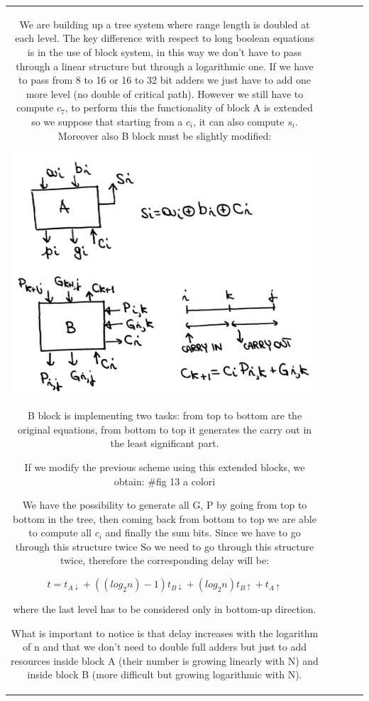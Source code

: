 \begin{center}
\begin{tabular}{|c|c|c|c|c|}
We are building up a tree system where range length is doubled at each level. The key difference with respect to long boolean equations is in the use of block system, in this way we don't have to pass through a linear structure but through a logarithmic one. If we have to pass from 8 to 16 or 16 to 32 bit adders we just have to add one more level (no double of critical path). However we still have to compute $c_7$, to perform this the functionality of block A is extended so we suppose that starting from a $c_i$, it can also compute $s_i$. Moreover also B block must be slightly modified:
\begin{center}
  \includegraphics[width=0.6\linewidth]{img/img2/14}
\end{center}

B block is implementing two tasks: from top to bottom are the original equations, from bottom to top it generates the carry out in the least significant part.

If we modify the previous scheme using this extended blocks, we obtain:
\#fig 13 a colori

We have the possibility to generate all G, P by going from top to bottom in the tree, then coming back from bottom to top we are able to compute all $c_i$ and finally the sum bits. Since we have to go through this structure twice So we need to go through this structure twice, therefore the corresponding delay will be:

$$t=t_{A \downarrow} + ((log_2 n)-1) t_{B \downarrow} + (log_2n)t_{B \uparrow}+t_{A \uparrow}$$

where the last level has to be considered only in bottom-up direction.

What is important to notice is that delay increases with the logarithm of n and that we don't need to double full adders but just to add resources inside block A (their number is growing linearly with N) and inside block B (more difficult but growing logarithmic with N).


\end{tabular}
\end{center}
